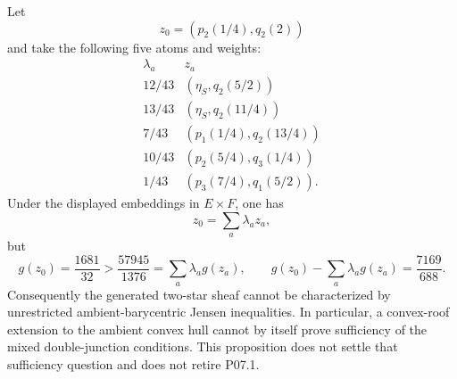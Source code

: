 \begin{proposition}
Let
\[
 z_0=(p_2(1/4),q_2(2))
\]
and take the following five atoms and weights:
\begin{equation}
\begin{array}{c|c}
 \lambda_a&z_a\\ \hline
 12/43&(\eta_S,q_2(5/2))\\
 13/43&(\eta_S,q_2(11/4))\\
 7/43 &(p_1(1/4),q_2(13/4))\\
 10/43&(p_2(5/4),q_3(1/4))\\
 1/43 &(p_3(7/4),q_1(5/2)).
\end{array}
\label{eq:p071-offcenter-atoms}
\end{equation}
Under the displayed embeddings in $E\times F$, one has
\begin{equation}
                 z_0=\sum_a\lambda_az_a,
 \label{eq:p071-offcenter-barycentre}
\end{equation}
but
\begin{equation}
 g(z_0)=\frac{1681}{32}
   >\frac{57945}{1376}
   =\sum_a\lambda_ag(z_a),
 \qquad
 g(z_0)-\sum_a\lambda_ag(z_a)=\frac{7169}{688}.
 \label{eq:p071-offcenter-violation}
\end{equation}
Consequently the generated two-star sheaf cannot be characterized by
unrestricted ambient-barycentric Jensen inequalities.  In particular, a
convex-roof extension to the ambient convex hull cannot by itself prove
sufficiency of the mixed double-junction conditions.  This proposition
does not settle that sufficiency question and does not retire P07.1.
\end{proposition}
